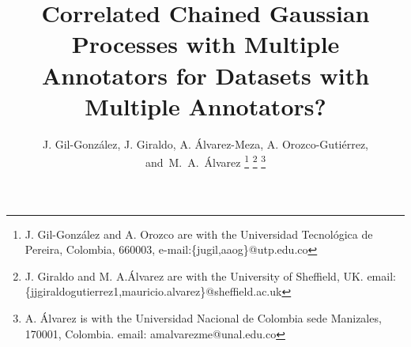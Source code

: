 \documentclass[journal]{IEEEtran}
\newcommand{\comment}[2]{{\color{blue}#1} {\color{red}#2}}
\begin{document}
%
\title{Correlated Chained Gaussian Processes \comment{with Multiple
    Annotators}{for Datasets with Multiple Annotators?}}
%
%
%

\author{J. Gil-Gonz\'alez,
        J. Giraldo,
        A. \'Alvarez-Meza, A. Orozco-Guti\'errez,  and~M.~A.~\'Alvarez%
\thanks{J. Gil-Gonz\'alez and A. Orozco are with the Universidad Tecnol\'ogica de Pereira, Colombia, 660003, e-mail:\{jugil,aaog\}@utp.edu.co}%
\thanks{J. Giraldo and M. A.\'Alvarez are with the University of Sheffield, UK. email: \{jjgiraldogutierrez1,mauricio.alvarez\}@sheffield.ac.uk}%
\thanks{A. \'Alvarez is with the Universidad Nacional de Colombia sede Manizales, 170001, Colombia. email: amalvarezme@unal.edu.co}}

% 
%
\end{document}
